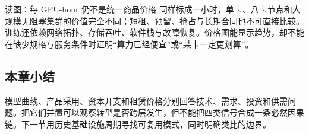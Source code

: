 \begin{warningbox}{读图：每 GPU-hour 仍不是统一商品价格}
同样标成一小时，单卡、八卡节点和大规模无阻塞集群的价值完全不同；短租、预留、抢占与长期合同也不可直接比较。训练还依赖网络拓扑、存储吞吐、软件栈与故障恢复。价格图能显示趋势，却不能在缺少规格与服务条件时证明“算力已经便宜”或“某卡一定更划算”。
\end{warningbox}

\subsection{本章小结}

模型曲线、产品采用、资本开支和租赁价格分别回答技术、需求、投资和供需问题。把它们并置可以观察转型是否跨层发生，但不能把四类信号合成一条必然因果链。下一节用历史基础设施周期寻找可复用模式，同时明确类比的边界。

